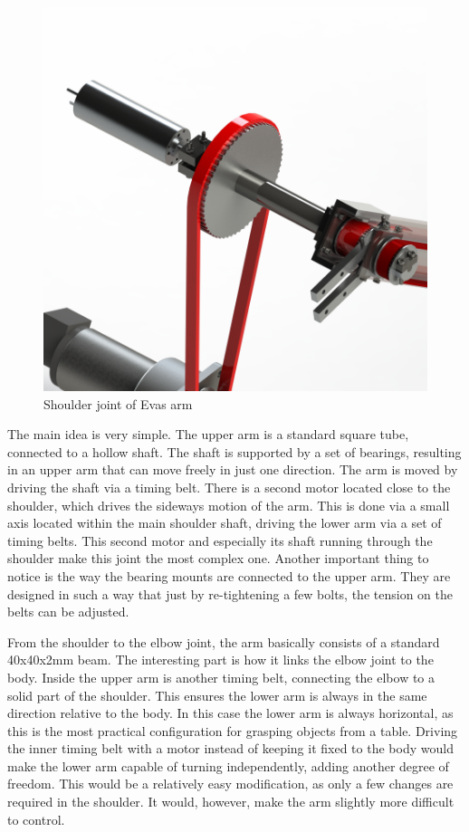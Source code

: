 \documentclass[technical_document.tex]{subfiles}
\begin{document}
\begin{figure}[ht!]
	\centering
	\mbox{\includegraphics[scale=1.0]{Images/arm_shoulder.png}}
	\caption{Shoulder joint of Eva\textquotesingle{}s arm}
	\label{fig:arm_shoulder}
\end{figure}

The main idea is very simple. The upper arm is a standard square tube, connected to a hollow shaft. The shaft is supported by a set of bearings, resulting in an upper arm that can move freely in just one direction. The arm is moved by driving the shaft via a timing belt. There is a second motor located close to the shoulder, which drives the sideways motion of the arm. This is done via a small axis located within the main shoulder shaft, driving the lower arm via a set of timing belts. This second motor and especially its shaft running through the shoulder make this joint the most complex one. Another important thing to notice is the way the bearing mounts are connected to the upper arm. They are designed in such a way that just by re-tightening a few bolts, the tension on the belts can be adjusted.

From the shoulder to the elbow joint, the arm basically consists of a standard 40x40x2mm beam. The interesting part is how it links the elbow joint to the body. Inside the upper arm is another timing belt, connecting the elbow to a solid part of the shoulder. This ensures the lower arm is always in the same direction relative to the body. In this case the lower arm is always horizontal, as this is the most practical configuration for grasping objects from a table. Driving the inner timing belt with a motor instead of keeping it fixed to the body would make the lower arm capable of turning independently, adding another degree of freedom. This would be a relatively easy modification, as only a few changes are required in the shoulder. It would, however, make the arm slightly more difficult to control.
\end{document}
